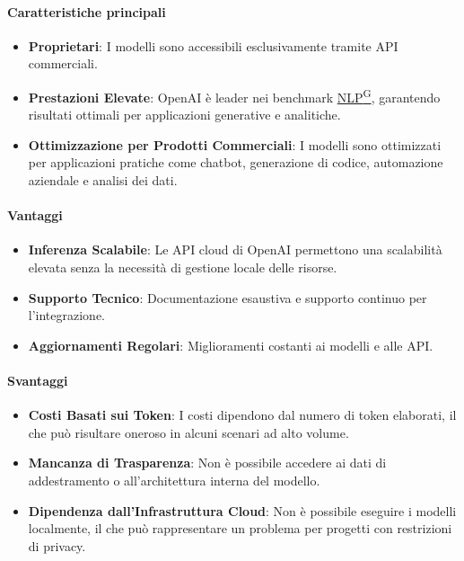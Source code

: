 \documentclass{article}
\begin{document}
\paragraph*{Caratteristiche principali}
\begin{itemize}
    \item \textbf{Proprietari}: I modelli sono accessibili esclusivamente tramite API commerciali.
    \item \textbf{Prestazioni Elevate}: OpenAI è leader nei benchmark \href{https://code7crusaders.github.io/docs/RTB/documentazione_interna/glossario.html#natural-language-processing-nlp}{NLP\textsuperscript{G}}, garantendo risultati ottimali per applicazioni generative e analitiche.
    \item \textbf{Ottimizzazione per Prodotti Commerciali}: I modelli sono ottimizzati per applicazioni pratiche come chatbot, generazione di codice, automazione aziendale e analisi dei dati.
\end{itemize}

\paragraph*{Vantaggi}
\begin{itemize}
    \item \textbf{Inferenza Scalabile}: Le API cloud di OpenAI permettono una scalabilità elevata senza la necessità di gestione locale delle risorse.
    \item \textbf{Supporto Tecnico}: Documentazione esaustiva e supporto continuo per l'integrazione.
    \item \textbf{Aggiornamenti Regolari}: Miglioramenti costanti ai modelli e alle API.
\end{itemize}

\paragraph*{Svantaggi}
\begin{itemize}
    \item \textbf{Costi Basati sui Token}: I costi dipendono dal numero di token elaborati, il che può risultare oneroso in alcuni scenari ad alto volume.
    \item \textbf{Mancanza di Trasparenza}: Non è possibile accedere ai dati di addestramento o all'architettura interna del modello.
    \item \textbf{Dipendenza dall'Infrastruttura Cloud}: Non è possibile eseguire i modelli localmente, il che può rappresentare un problema per progetti con restrizioni di privacy.
\end{itemize}
\end{document}

